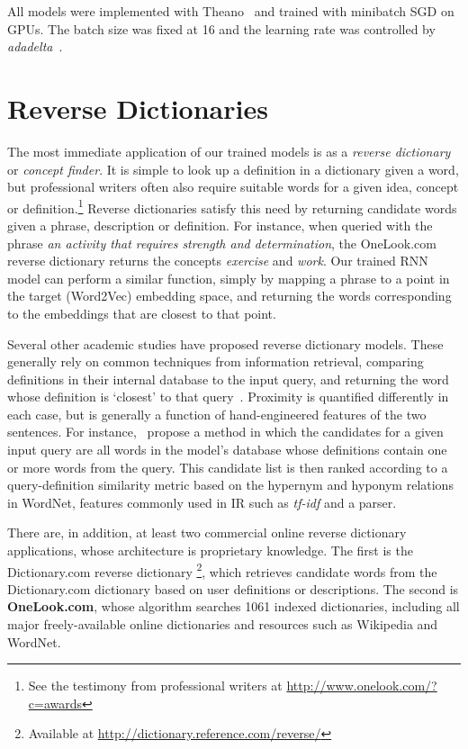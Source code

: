 \documentclass[11pt,letterpaper]{article}
\begin{document}
All models were implemented with Theano~\cite{bergstra+al:2010-scipy} and trained with minibatch SGD on GPUs. The batch size was fixed at 16 and the learning rate was controlled by \emph{adadelta}~\cite{zeiler2012adadelta}. %

\section{Reverse Dictionaries}

The most immediate application of our trained models is as a \emph{reverse dictionary} or \emph{concept finder}. It is simple to look up a definition in a dictionary given a word, but professional writers often also require suitable words for a given idea, concept or definition.\footnote{See the testimony from professional writers at \url{http://www.onelook.com/?c=awards}} Reverse dictionaries satisfy this need by returning candidate words given a phrase, description or definition. For instance, when queried with the phrase \emph{an activity that requires strength and determination}, the OneLook.com reverse dictionary returns the concepts \emph{exercise} and \emph{work}. Our trained RNN model can perform a similar function, simply by mapping a phrase to a point in the target (Word2Vec) embedding space, and returning the words corresponding to the embeddings that are closest to that point.  

Several other academic studies have proposed reverse dictionary models. These generally rely on common techniques from information retrieval, comparing definitions in their internal database to the input query, and returning the word whose definition is `closest' to that query~\cite{bilac2003improving,bilac2004dictionary,zock2004word}. Proximity is quantified differently in each case, but is generally a function of hand-engineered features of the two sentences. For instance,~ propose a method in which the candidates for a given input query are all words in the model's database whose definitions contain one or more words from the query. This candidate list is then ranked according to a query-definition similarity metric based on the hypernym and hyponym relations in WordNet, features commonly used in IR such as \emph{tf-idf} and a parser. 

There are, in addition, at least two commercial online reverse dictionary applications, whose architecture is proprietary knowledge. The first is the Dictionary.com reverse dictionary \footnote{Available at \url{http://dictionary.reference.com/reverse/}}, which retrieves candidate words from the Dictionary.com dictionary based on user definitions or descriptions. The second is {\bf OneLook.com}, whose algorithm searches 1061 indexed dictionaries, including all major freely-available online dictionaries and resources such as Wikipedia and WordNet.
\end{document}
